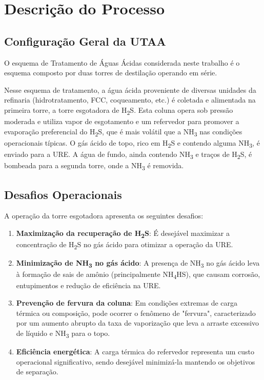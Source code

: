 \section{Descrição do Processo}\label{sec:processo}

\subsection{Configuração Geral da UTAA}

O esquema de Tratamento de Águas Ácidas considerada neste trabalho é o esquema composto por duas torres de destilação operando em série.

Nesse esquema de tratamento, a água ácida proveniente de diversas unidades da refinaria (hidrotratamento, FCC, coqueamento, etc.) é coletada e alimentada na primeira torre, a torre esgotadora de H\textsubscript{2}S. Esta coluna opera sob pressão moderada e utiliza vapor de esgotamento e um refervedor para promover a evaporação preferencial do H\textsubscript{2}S, que é mais volátil que a NH\textsubscript{3} nas condições operacionais típicas. O gás ácido de topo, rico em H\textsubscript{2}S e contendo alguma NH\textsubscript{3}, é enviado para a URE. A água de fundo, ainda contendo NH\textsubscript{3} e traços de H\textsubscript{2}S, é bombeada para a segunda torre, onde a NH\textsubscript{3} é removida.


\subsection{Desafios Operacionais}

A operação da torre esgotadora apresenta os seguintes desafios:

\begin{enumerate}
  \item \textbf{Maximização da recuperação de H\textsubscript{2}S}: É desejável maximizar a concentração de H\textsubscript{2}S no gás ácido para otimizar a operação da URE.
  \item \textbf{Minimização de NH\textsubscript{3} no gás ácido}: A presença de NH\textsubscript{3} no gás ácido leva à formação de sais de amônio (principalmente NH\textsubscript{4}HS), que causam corrosão, entupimentos e redução de eficiência na URE.
  \item \textbf{Prevenção de fervura da coluna}: Em condições extremas de carga térmica ou composição, pode ocorrer o fenômeno de "fervura", caracterizado por um aumento abrupto da taxa de vaporização que leva a arraste excessivo de líquido e NH\textsubscript{3} para o topo.
  \item \textbf{Eficiência energética}: A carga térmica do refervedor representa um custo operacional significativo, sendo desejável minimizá-la mantendo os objetivos de separação.
\end{enumerate}

